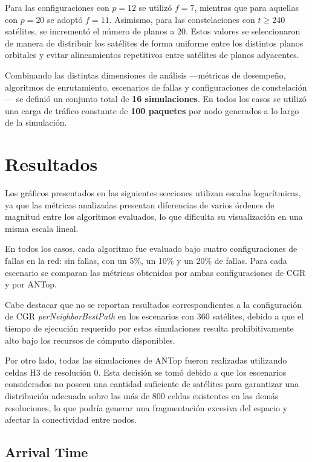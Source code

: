 Para las configuraciones con $p = 12$ se utilizó $f = 7$, mientras que para aquellas con $p = 20$ se adoptó $f = 11$. Asimismo, para las constelaciones con $t \geq 240$ satélites, se incrementó el número de planos a $20$. Estos valores se seleccionaron de manera de distribuir los satélites de forma uniforme entre los distintos planos orbitales y evitar alineamientos repetitivos entre satélites de planos adyacentes.

Combinando las distintas dimensiones de análisis —métricas de desempeño, algoritmos de enrutamiento, escenarios de fallas y configuraciones de constelación— se definió un conjunto total de \textbf{16 simulaciones}. En todos los casos se utilizó una carga de tráfico constante de \textbf{100 paquetes} por nodo generados a lo largo de la simulación.

\section{Resultados}
Los gráficos presentados en las siguientes secciones utilizan escalas logarítmicas, ya que las métricas analizadas presentan diferencias de varios órdenes de magnitud entre los algoritmos evaluados, lo que dificulta su visualización en una misma escala lineal.

En todos los casos, cada algoritmo fue evaluado bajo cuatro configuraciones de fallas en la red: sin fallas, con un 5\%, un 10\% y un 20\% de fallas. Para cada escenario se comparan las métricas obtenidas por ambas configuraciones de CGR y por ANTop.

Cabe destacar que no se reportan resultados correspondientes a la configuración de CGR \textit{perNeighborBestPath} en los escenarios con 360 satélites, debido a que el tiempo de ejecución requerido por estas simulaciones resulta prohibitivamente alto bajo los recursos de cómputo disponibles.

Por otro lado, todas las simulaciones de ANTop fueron realizadas utilizando celdas H3 de resolución 0. Esta decisión se tomó debido a que los escenarios considerados no poseen una cantidad suficiente de satélites para garantizar una distribución adecuada sobre las más de 800 celdas existentes en las demás resoluciones, lo que podría generar una fragmentación excesiva del espacio y afectar la conectividad entre nodos.

\subsection{Arrival Time}

